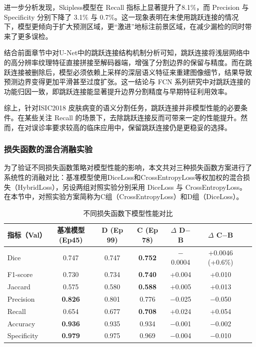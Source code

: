 进一步分析发现，Skipless模型在 Recall 指标上显著提升了8.1\%，而 Precision 与 Specificity 分别下降了 3.1\% 与 0.7\%。这一现象表明在未使用跳跃连接的情况下，模型更倾向于扩大预测区域，更“激进”地标注前景区域，在减少漏检的同时带来了更多误检。

结合前面章节中对U-Net中的跳跃连接结构机制分析可知，跳跃连接将浅层网络中的高分辨率纹理特征直接拼接至解码器端，增强了分割边界的保留与精度。而在跳跃连接被删除后，模型必须依赖上采样的深层语义特征来重建图像细节，结果导致预测边界变得更加平滑甚至过度扩张。这一结论与 FCN 系列研究中对跳跃连接的功能归因一致，即跳跃连接能显著提升边界分割精度与早期特征利用效率\cite{milletari2016}。

综上，针对ISIC2018 皮肤病变的语义分割任务，跳跃连接并非模型性能的必要条件。在某些关注 Recall 的场景下，去除跳跃连接反而可带来一定的性能提升。然而，在对误诊率要求较高的临床应用中，保留跳跃连接仍是更稳妥的选择。

\subsubsection{损失函数的混合消融实验}

为了验证不同损失函数策略对模型性能的影响，本文共对三种损失函数方案进行了系统性的消融对比：基准模型使用DiceLoss和CrossEntropyLoss等权加权的混合损失（HybridLoss），另设两组对照实验分别采用 DiceLoss 与 CrossEntropyLoss。在本节中，对照实验方案简称为C组（CrossEntropyLoss）和D组（DiceLoss）。

\begin{table}[htbp]
    \centering
    \caption{不同损失函数下模型性能对比}
    \label{tab:loss_ablation}
    \begin{tabular}{lcccccc}
        \toprule
        指标（Val） & 基准模型(Ep45) & D (Ep 99) & C (Ep 78) & $\Delta$ D$-$B & $\Delta$ C$-$B \\
        \midrule
        Dice        & 0.747 & 0.747 & \textbf{0.752} & $-$0.0004 & +0.0046 (+0.6\%) \\
        F1-score    & 0.730 & 0.734 & \textbf{0.740} & +0.004 & +0.010 \\
        Jaccard     & 0.575 & 0.580 & \textbf{0.588} & +0.005 & +0.013 \\
        Precision   & \textbf{0.826} & 0.801 & 0.776 & $-$0.025 & $-$0.050 \\
        Recall      & 0.654 & 0.677 & \textbf{0.708} & +0.024 & +0.054 \\
        Accuracy    & \textbf{0.936} & 0.935 & 0.934 & $-$0.001 & $-$0.002 \\
        Specificity & \textbf{0.979} & 0.975 & 0.969 & $-$0.004 & $-$0.010 \\
        \bottomrule
    \end{tabular}
\end{table}



